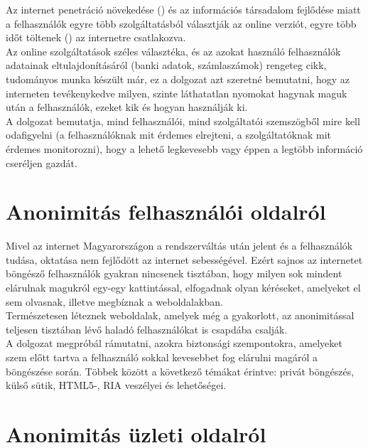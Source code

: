 
Az internet penetráció növekedése (\cite{internet_penet}) és az információs társadalom fejlődése miatt a felhasználók egyre több szolgáltatásból választják az online verziót, egyre több időt töltenek (\cite{internet_time}) az internetre csatlakozva.\\
Az online szolgáltatások széles választéka, és az azokat használó felhasználók adatainak eltulajdonításáról (banki adatok, számlaszámok) rengeteg cikk, tudományos munka készült már, ez a dolgozat azt szeretné bemutatni, hogy az interneten tevékenykedve milyen, szinte láthatatlan nyomokat hagynak maguk után a felhasználók, ezeket kik és hogyan használják ki.\\
A dolgozat bemutatja, mind felhasználói, mind szolgáltatói szemszögből mire kell odafigyelni (a felhasználóknak mit érdemes elrejteni, a szolgáltatóknak mit érdemes monitorozni), hogy a lehető legkevesebb vagy éppen a legtöbb információ cseréljen gazdát.
\\
\clearpage

\section{Anonimitás felhasználói oldalról} %
\label{sec:anonimitás_felhasználói_oldalról}

Mivel az internet Magyarországon a rendszerváltás után jelent és a felhasználók tudása, oktatása nem fejlődött az internet sebességével. Ezért sajnos az internetet böngésző felhasználók gyakran nincsenek tisztában, hogy milyen sok mindent elárulnak magukról egy-egy kattintással, elfogadnak olyan kéréseket, amelyeket el sem olvasnak, illetve megbíznak a weboldalakban.\\
Természetesen léteznek weboldalak, amelyek még a gyakorlott, az anonimitással teljesen tisztában lévő haladó felhasználókat is csapdába csalják.\\
A dolgozat megpróbál rámutatni, azokra biztonsági szempontokra, amelyeket szem előtt tartva a felhasználó sokkal kevesebbet fog elárulni magáról a böngészése során. Többek között a következő témákat érintve: privát böngészés, külső sütik, HTML5-, RIA veszélyei és lehetőségei.

\section{Anonimitás üzleti oldalról} %
\label{sec:anonimitás_üzleti_oldalról}

